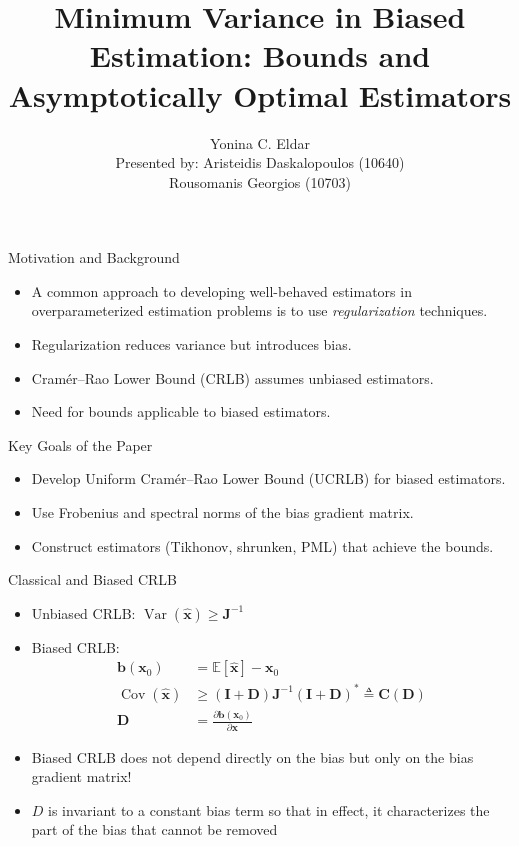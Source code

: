 \documentclass{beamer}
\title[Minimum Variance in Biased Estimation]{Minimum Variance in Biased Estimation: Bounds and Asymptotically Optimal Estimators}
\author{Yonina C. Eldar \\ Presented by: Aristeidis Daskalopoulos (10640) \\ Rousomanis Georgios (10703)}
\institute{IEEE Transactions on Signal Processing, July 2004}
\date{}
\begin{document}
\begin{frame}
  \titlepage
\end{frame}

\begin{frame}{Motivation and Background}
  \begin{itemize}
    \item A common approach to developing well-behaved estimators
    in overparameterized estimation problems is to use \textit{regularization} techniques.
    \item Regularization reduces variance but introduces bias.
    \item Cramér–Rao Lower Bound (CRLB) assumes unbiased estimators.
    \item Need for bounds applicable to biased estimators.
  \end{itemize}
\end{frame}

\begin{frame}{Key Goals of the Paper}
  \begin{itemize}
    \item Develop Uniform Cramér–Rao Lower Bound (UCRLB) for biased estimators.
    \item Use Frobenius and spectral norms of the bias gradient matrix.
    \item Construct estimators (Tikhonov, shrunken, PML) that achieve the bounds.
  \end{itemize}
\end{frame}

\begin{frame}{Classical and Biased CRLB}
  \begin{itemize}
    \item Unbiased CRLB: $\operatorname{Var}(\hat{\mathbf{x}}) \geq \mathbf{J}^{-1}$
    \item Biased CRLB:
    \begin{equation*}
        \begin{aligned}
            \mathbf{b}(\mathbf{x}_0) &= \mathbb{E}[\hat{\mathbf{x}}] - \mathbf{x}_0 \\
            \operatorname{Cov}(\hat{\mathbf{x}}) &\geq (\mathbf{I} + \mathbf{D}) \mathbf{J}^{-1} 
            (\mathbf{I} + \mathbf{D})^* \triangleq \mathbf{C}(\mathbf{D}) \\
            \mathbf{D} &= \frac{\partial \mathbf{b}(\mathbf{x}_0)}{\partial \mathbf{x}}
        \end{aligned}
    \end{equation*}
    \item Biased CRLB does not depend directly on the bias but only on the bias gradient matrix!
    \item $D$ is invariant to a constant bias term so that in effect, it characterizes the part of the bias 
    that cannot be removed
  \end{itemize}
\end{frame}
\end{document}
